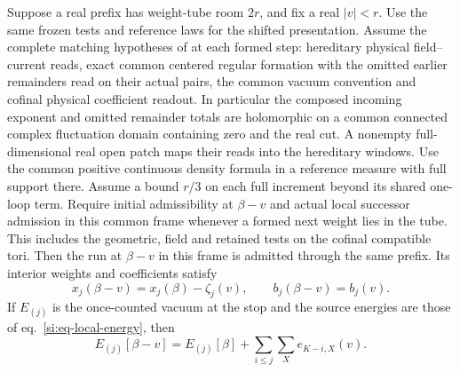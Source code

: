 \documentclass[11pt,letterpaper,reqno]{amsart}
\makeatletter
\numberwithin{equation}{section}
\renewcommand{\eqref}[1]{\textup{eq.~\ref{#1}}}
\theoremstyle{definition}
\newcommand{\ms@minorstart}{%
  \pushQED{\qed}\renewcommand{\qedsymbol}{$\blacksquare$}}
\newenvironment{proposition}[1][]{\ms@minorstart\ms@proposition[#1]}
  {\popQED\endms@proposition}
\theoremstyle{remark}
\makeatother
\begin{document}
\begin{samepage}
\begin{proposition}[A real shift in the same frame]
\label{si:prop-same-frame-source}
Suppose a real prefix has weight-tube room $2r$, and fix a real
$|v|<r$. Use the same frozen tests and reference laws for the
shifted presentation. Assume the complete matching hypotheses
of \cite[Proposition~7.1]{RT} at each formed step: hereditary
physical field--current reads, exact common centered regular
formation with the omitted earlier remainders read on their
actual pairs, the common vacuum convention and cofinal physical
coefficient readout. In particular the composed incoming exponent
and omitted remainder totals are holomorphic on a common connected
complex fluctuation domain containing zero and the real cut.
A nonempty full-dimensional real open patch maps their reads into
the hereditary windows. Use the common positive continuous
density formula in a reference measure with full support there.
Assume a bound $r/3$ on each full increment beyond its shared
one-loop term. Require initial admissibility at $\beta-v$ and
actual local successor admission in this common frame whenever
a formed next weight lies in the tube. This includes the geometric,
field and retained tests on the cofinal compatible tori.
Then the run at $\beta-v$ in this frame is admitted through the
same prefix. Its interior weights and
coefficients satisfy
\begin{equation}\label{si:eq-same-frame-source}
 x_j(\beta-v)=x_j(\beta)-\zeta_j(v),\qquad
 b_j(\beta-v)=b_j(v).
\end{equation}
If $E_{(j)}$ is the once-counted vacuum at the stop and the source
energies are those of \eqref{si:eq-local-energy}, then
\begin{equation}\label{si:eq-real-source-vacuum}
 E_{(j)}[\beta-v]=E_{(j)}[\beta]+\sum_{i\le j}\sum_X e_{K-i,X}(v).
\end{equation}
\end{proposition}
\end{samepage}
\end{document}
